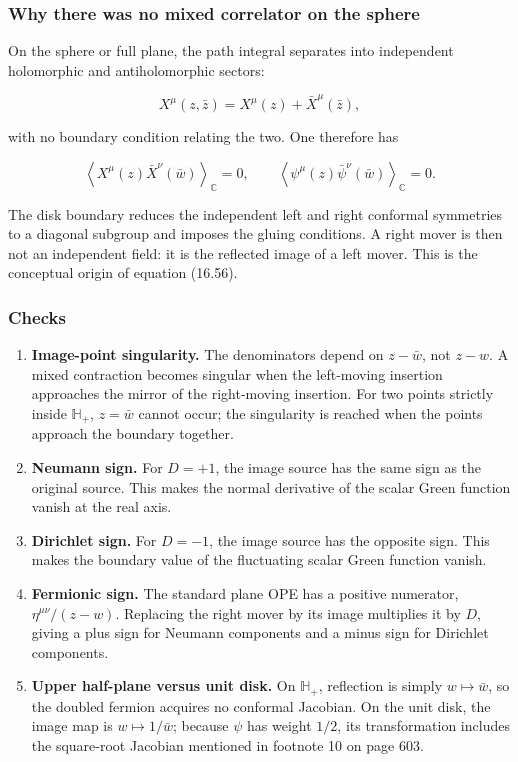 \documentclass[
  10pt,
  a4paper,
  openany]{book}
\begin{document}
\subsubsection{Why there was no mixed correlator on the
sphere}\label{why-there-was-no-mixed-correlator-on-the-sphere}

On the sphere or full plane, the path integral separates into
independent holomorphic and antiholomorphic sectors:

\[
X^\mu(z,\bar z)=X^\mu(z)+\bar X^\mu(\bar z),
\]

with no boundary condition relating the two. One therefore has

\[
\left\langle X^\mu(z)\bar X^\nu(\bar w)\right\rangle_{\mathbb C}=0,
\qquad
\left\langle\psi^\mu(z)\bar\psi^\nu(\bar w)\right\rangle_{\mathbb C}=0.
\]

The disk boundary reduces the independent left and right conformal
symmetries to a diagonal subgroup and imposes the gluing conditions. A
right mover is then not an independent field: it is the reflected image
of a left mover. This is the conceptual origin of equation (16.56).

\subsubsection{Checks}\label{checks-28}

\begin{enumerate}
\def\labelenumi{\arabic{enumi}.}
\item
  \textbf{Image-point singularity.} The denominators depend on
  \(z-\bar w\), not \(z-w\). A mixed contraction becomes singular when
  the left-moving insertion approaches the mirror of the right-moving
  insertion. For two points strictly inside \(\mathbb H_+\),
  \(z=\bar w\) cannot occur; the singularity is reached when the points
  approach the boundary together.
\item
  \textbf{Neumann sign.} For \(D=+1\), the image source has the same
  sign as the original source. This makes the normal derivative of the
  scalar Green function vanish at the real axis.
\item
  \textbf{Dirichlet sign.} For \(D=-1\), the image source has the
  opposite sign. This makes the boundary value of the fluctuating scalar
  Green function vanish.
\item
  \textbf{Fermionic sign.} The standard plane OPE has a positive
  numerator, \(\eta^{\mu\nu}/(z-w)\). Replacing the right mover by its
  image multiplies it by \(D\), giving a plus sign for Neumann
  components and a minus sign for Dirichlet components.
\item
  \textbf{Upper half-plane versus unit disk.} On \(\mathbb H_+\),
  reflection is simply \(w\mapsto\bar w\), so the doubled fermion
  acquires no conformal Jacobian. On the unit disk, the image map is
  \(w\mapsto1/\bar w\); because \(\psi\) has weight \(1/2\), its
  transformation includes the square-root Jacobian mentioned in footnote
  10 on page 603.
\end{enumerate}
\end{document}

